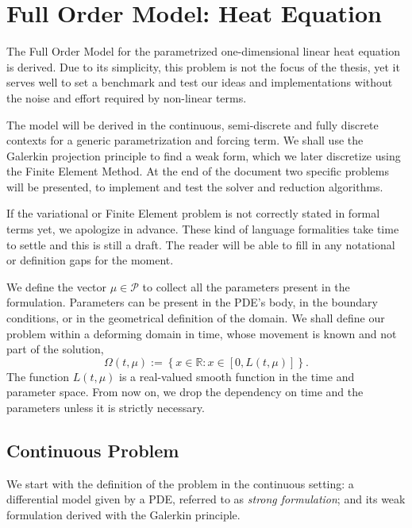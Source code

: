 \documentclass[../../main.tex]{subfiles}
\begin{document}
\section{Full Order Model: Heat Equation}
\label{sec:1d_fom_heat_equation_full_order_model}
The Full Order Model for the parametrized one-dimensional linear heat equation is derived.
Due to its simplicity, this problem is not the focus of the thesis, yet it serves well to set a benchmark and test our ideas and implementations without the noise and effort required by non-linear terms.

The model will be derived in the continuous, semi-discrete and fully discrete contexts for a generic parametrization and forcing term.
We shall use the Galerkin projection principle to find a weak form, which we later discretize using the Finite Element Method. 
At the end of the document two specific problems will be presented, to implement and test the solver and reduction algorithms. 

If the variational or Finite Element problem is not correctly stated in formal terms yet, we apologize in advance.
These kind of language formalities take time to settle and this is still a draft. 
The reader will be able to fill in any notational or definition gaps for the moment. 

We define the vector $\mu \in \mathcal{P}$ to collect all the parameters present in the formulation.
Parameters can be present in the PDE's body, in the boundary conditions, or in the geometrical definition of the domain. 
We shall define our problem within a deforming domain in time, whose movement is known and not part of the solution,
\begin{equation*}
    \Omega(t, \mu) := \left\{x \in \mathbb{R} : x \in \left[0, L(t, \mu)\right]\right\}.
\end{equation*}
The function $L(t, \mu)$ is a real-valued smooth function in the time and parameter space.
From now on, we drop the dependency on time and the parameters unless it is strictly necessary. 

\subsection{Continuous Problem}
We start with the definition of the problem in the continuous setting: 
a differential model given by a PDE, referred to as \emph{strong formulation}; 
and its weak formulation derived with the Galerkin principle.
\end{document}
